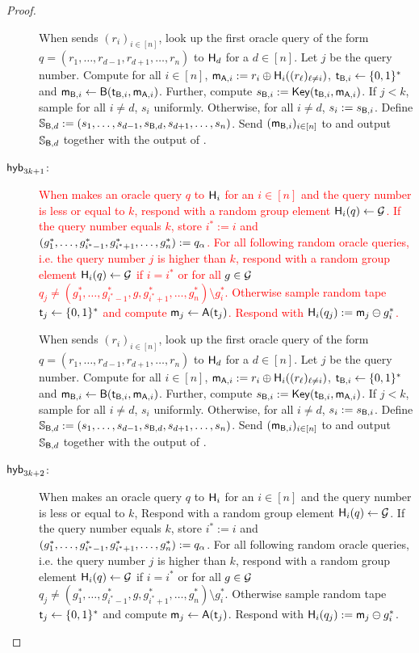 \begin{proof}
\begin{description}
When \Adv sends $(r_i)_{i\in[n]}$, look up the first oracle query of the form $q= (r_1,\dots, r_{d-1},r_{d+1},\dots, r_{n})$ to $\mathsf{H}_d$ for a $d\in[n]$. Let $j$ be the query number. Compute for all $i\in[n]$, $\mathsf{m}_{\mathsf{A},i}:=r_i\oplus\mathsf{H}_i((r_\ell)_{\ell\neq i})$, $\mathsf{t}_{\mathsf{B},i}\leftarrow\{0,1\}^*$ and $\mathsf{m}_{\mathsf{B},i}\leftarrow\mathsf{B}(\mathsf{t}_{\mathsf{B},i},\mathsf{m}_{\mathsf{A},i})$. Further, compute $s_{\mathsf{B},i}:=\mathsf{Key}(\mathsf{t}_{\mathsf{B},i},\mathsf{m}_{\mathsf{A},i})$. If $j<k$, sample for all $i\neq d$, $s_i$ uniformly. Otherwise, for all $i\neq d$, $s_i:=s_{\mathsf{B},i}$.   Define $\mathsf{\mathbb S}_{\mathsf{B},d}:=(s_{1},\dots, s_{d-1},s_{\mathsf{B},d},s_{d+1},\dots, s_{n})$.  
 Send $(\mathsf{m}_{\mathsf{B},i})_{i\in[n]}$ to \Adv and output $\mathsf{\mathbb S}_{\mathsf{B},d}$ together with the output of \Adv. 
\item[$\mathsf{hyb}_{3k+1}$:]  \textcolor{red}{When \Adv makes an oracle query $q$ to $\mathsf{H}_i$ for an $i\in[n]$ and the query number is less or equal to $k$, respond with a random group element $\mathsf{H}_i(q)\leftarrow\mathcal{G}$. 
If the query number equals $k$, store $i^*:=i$ and $(g^*_1,\dots, g^*_{i^*-1},g^*_{i^*+1},\dots, g^*_{n}):=q_{\alpha}$. 
For all following random oracle queries, i.e. the query number $j$ is higher than $k$, respond with a random group element $\mathsf{H}_i(q)\leftarrow\mathcal{G}$ if $i=i^*$ or for all $g\in\mathcal{G}$ $q_j\neq (g^*_1,\dots, g^*_{i^*-1},g,g^*_{i^*+1},\dots, g^*_{n})\setminus g^*_i$. Otherwise sample random tape $\mathsf{t}_j\leftarrow\{0,1\}^*$ and compute $\mathsf{m}_{j}\leftarrow\mathsf{A}(\mathsf{t}_j)$. 
Respond with $\mathsf{H}_i(q_j):=\mathsf{m}_j\ominus g^*_{i}$.}

When \Adv sends $(r_i)_{i\in[n]}$, look up the first oracle query of the form $q= (r_1,\dots, r_{d-1},r_{d+1},\dots, r_{n})$ to $\mathsf{H}_d$ for a $d\in[n]$. Let $j$ be the query number. Compute for all $i\in[n]$, $\mathsf{m}_{\mathsf{A},i}:=r_i\oplus\mathsf{H}_i((r_\ell)_{\ell\neq i})$, $\mathsf{t}_{\mathsf{B},i}\leftarrow\{0,1\}^*$ and $\mathsf{m}_{\mathsf{B},i}\leftarrow\mathsf{B}(\mathsf{t}_{\mathsf{B},i},\mathsf{m}_{\mathsf{A},i})$. Further, compute $s_{\mathsf{B},i}:=\mathsf{Key}(\mathsf{t}_{\mathsf{B},i},\mathsf{m}_{\mathsf{A},i})$. If $j<k$, sample for all $i\neq d$, $s_i$ uniformly. Otherwise, for all $i\neq d$, $s_i:=s_{\mathsf{B},i}$.   Define $\mathsf{\mathbb S}_{\mathsf{B},d}:=(s_{1},\dots, s_{d-1},s_{\mathsf{B},d},s_{d+1},\dots, s_{n})$.  
 Send $(\mathsf{m}_{\mathsf{B},i})_{i\in[n]}$ to \Adv and output $\mathsf{\mathbb S}_{\mathsf{B},d}$ together with the output of \Adv. 
 \item[$\mathsf{hyb}_{3k+2}$:]  When \Adv makes an oracle query $q$ to $\mathsf{H}_i$ for an $i\in[n]$ and the query number is less or equal to $k$, Respond with a random group element $\mathsf{H}_i(q)\leftarrow\mathcal{G}$. 
If the query number equals $k$, store $i^*:=i$ and $(g^*_1,\dots, g^*_{i^*-1},g^*_{i^*+1},\dots, g^*_{n}):=q_{\alpha}$. 
For all following random oracle queries, i.e. the query number $j$ is higher than $k$, respond with a random group element $\mathsf{H}_i(q)\leftarrow\mathcal{G}$ if $i=i^*$ or for all $g\in\mathcal{G}$ $q_j\neq (g^*_1,\dots, g^*_{i^*-1},g,g^*_{i^*+1},\dots, g^*_{n})\setminus g^*_i$. Otherwise sample random tape $\mathsf{t}_j\leftarrow\{0,1\}^*$ and compute $\mathsf{m}_{j}\leftarrow\mathsf{A}(\mathsf{t}_j)$. 
Respond with $\mathsf{H}_i(q_j):=\mathsf{m}_j\ominus g^*_{i}$. 


\end{description}
\end{proof}
